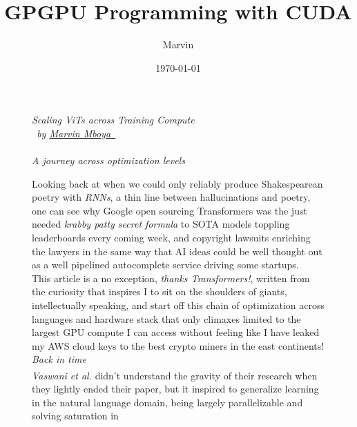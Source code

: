 \documentclass[12pt]{article}
\newcommand{\sidecite}[1]{\textsuperscript{\textcolor{blue}{\textbf{\scriptsize#1}}}}
\newcommand{\maincitecount}{\sidecite{\stepcounter{maincite}\themaincite}}
\begin{document}

\linespread{1.2}\selectfont
\title{GPGPU Programming with CUDA}
\author{Marvin}
\date{\today}


\begin{figure}[!htb]
    \begin{minipage}[t]{0.65\textwidth}
    {\sffamily 
    \fontsize{21}{8}\textcolor{xtitle}{\textit{Scaling ViTs across Training Compute}}\\
    \fontsize{9}{8}\textcolor{xtitle}{
        \textit{
            \ by \href{https://www.linkedin.com/in/marvin-mboya}{Marvin Mboya\ \faLinkedinSquare}
    }}\\
    }\\
    [-0.3cm]
    \textcolor{xtitle}{{\it A journey across optimization levels}}\\
    [0.2cm]
    \normalsize
    \raggedright
    Looking back at when we could only reliably produce Shakespearean poetry with {\it RNNs}, a thin line between hallucinations 
    and poetry, one can see why Google open sourcing Transformers was the just needed {\it krabby patty secret formula} to SOTA 
    models toppling leaderboards every coming week, and copyright lawsuits enriching the lawyers in the same way that AI ideas 
    could be well thought out as a well pipelined autocomplete service driving some startups.\\ 
    This article is a no exception, {\it thanks Transformers!}, written from the curiosity that inspires I to 
    sit on the shoulders of giants, intellectually speaking, and start off this chain of optimization across languages and hardware 
    stack that only climaxes limited to the largest GPU compute I can access without feeling like I have leaked my AWS cloud keys 
    to the best crypto miners in the east continents!
    \vspace{1.5em}\\
    \fontsize{14}{8}\textcolor{xtitle}{\textit{Back in time}}\\
    {\it Vaswani et al.} didn't understand the gravity of their research{\maincitecount} when they lightly ended their paper, but 
    it inspired to generalize learning in the natural language domain, being largely parallelizable and solving saturation in 

\end{minipage}
\end{figure}
\end{document}

